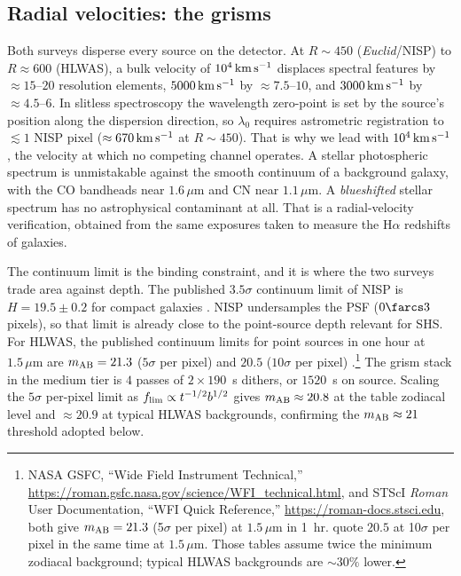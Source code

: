\documentclass[twocolumn]{aastex701}
\newcommand{\kms}{\,{\rm km\,s^{-1}}}
\begin{document}
\subsection{Radial velocities: the grisms}

Both surveys disperse every source on the detector. At $R\sim450$
(\textit{Euclid}/NISP) to $R\approx600$ (HLWAS), a bulk velocity of
$10^{4}\kms$ displaces spectral features by $\approx15$--$20$ resolution
elements, $5000\kms$ by $\approx7.5$--$10$, and $3000\kms$ by
$\approx4.5$--$6$. In slitless spectroscopy the wavelength zero-point is
set by the source's position along the dispersion direction, so
$\lambda_{0}$ requires astrometric registration to $\lesssim1$ NISP pixel
($\approx670\kms$ at $R\sim450$). That is why we lead with
$10^{4}\kms$, the velocity at which no competing channel operates. A
stellar photospheric spectrum is unmistakable against the smooth continuum of
a background galaxy, with the CO bandheads near $1.6\,\mu$m and CN near
$1.1\,\mu$m. A \emph{blueshifted} stellar spectrum has no astrophysical
contaminant at all. That is a radial-velocity verification, obtained from the
same exposures taken to measure the H$\alpha$ redshifts of galaxies.

The continuum limit is the binding constraint, and it is where the two
surveys trade area against depth. The published $3.5\sigma$ continuum limit of NISP
is $H=19.5\pm0.2$ for compact galaxies \citep{euclid23grism}. NISP
undersamples the PSF ($0\farcs3$ pixels), so that limit is already close to
the point-source depth relevant for SHS. For HLWAS, the published continuum limits
for point sources in one hour at $1.5\,\mu$m are $m_{\rm AB}=21.3$
($5\sigma$ per pixel) and $20.5$ ($10\sigma$ per pixel)
\citep{akeson19}.\footnote{NASA GSFC, ``Wide Field Instrument
Technical,'' \url{https://roman.gsfc.nasa.gov/science/WFI_technical.html},
and STScI \textit{Roman} User Documentation, ``WFI Quick Reference,''
\url{https://roman-docs.stsci.edu}, both give $m_{\rm AB}=21.3$ (5$\sigma$
per pixel) at $1.5\,\mu$m in 1~hr. \citet{akeson19} quote $20.5$ at
10$\sigma$ per pixel in the same time at $1.5\,\mu$m. Those tables assume
twice the minimum zodiacal background; typical HLWAS backgrounds are
$\sim30\%$ lower.}
The grism stack in the medium tier is $4$ passes of $2\times190$~s dithers, or
$1520$~s on source. Scaling the $5\sigma$ per-pixel limit as
$f_{\rm lim}\propto t^{-1/2}b^{1/2}$ gives $m_{\rm AB}\approx20.8$ at the
table zodiacal level and $\approx20.9$ at typical HLWAS backgrounds,
confirming the $m_{\rm AB}\approx21$ threshold adopted below.
\end{document}
